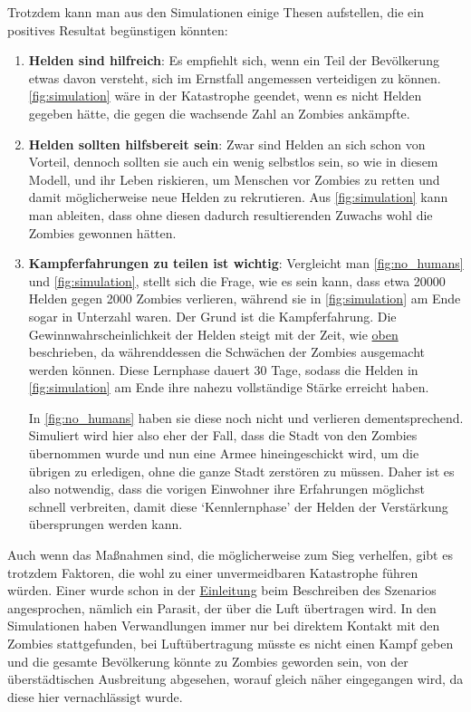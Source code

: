     Trotzdem kann man aus den Simulationen einige Thesen aufstellen, die ein positives Resultat begünstigen könnten:
    \begin{enumerate}[1.]
        \item \textbf{Helden sind hilfreich}:
            Es empfiehlt sich, wenn ein Teil der Bevölkerung etwas davon versteht, sich im Ernstfall angemessen verteidigen zu können. \autoref{fig:simulation} wäre in der Katastrophe geendet, wenn es nicht Helden gegeben hätte, die gegen die wachsende Zahl an Zombies ankämpfte.

        \item \textbf{Helden sollten hilfsbereit sein}:
            Zwar sind Helden an sich schon von Vorteil, dennoch sollten sie auch ein wenig selbstlos sein, so wie in diesem Modell, und ihr Leben riskieren, um Menschen vor Zombies zu retten und damit möglicherweise neue Helden zu rekrutieren. Aus \autoref{fig:simulation} kann man ableiten, dass ohne diesen dadurch resultierenden Zuwachs wohl die Zombies gewonnen hätten.

        \item \textbf{Kampferfahrungen zu teilen ist wichtig}:
            Vergleicht man \autoref{fig:no_humans} und \autoref{fig:simulation}, stellt sich die Frage, wie es sein kann, dass etwa 20000 Helden gegen 2000 Zombies verlieren, während sie in \autoref{fig:simulation} am Ende sogar in Unterzahl waren. Der Grund ist die Kampferfahrung. Die Gewinnwahrscheinlichkeit der Helden steigt mit der Zeit, wie \hyperref[steps:no_humans]{oben} beschrieben, da währenddessen die Schwächen der Zombies ausgemacht werden können. Diese Lernphase dauert 30 Tage, sodass die Helden in \autoref{fig:simulation} am Ende ihre nahezu vollständige Stärke erreicht haben.

            In \autoref{fig:no_humans} haben sie diese noch nicht und verlieren dementsprechend. Simuliert wird hier also eher der Fall, dass die Stadt von den Zombies übernommen wurde und nun eine Armee hineingeschickt wird, um die übrigen zu erledigen, ohne die ganze Stadt zerstören zu müssen. Daher ist es also notwendig, dass die vorigen Einwohner ihre Erfahrungen möglichst schnell verbreiten, damit diese `Kennlernphase' der Helden der Verstärkung übersprungen werden kann.
    \end{enumerate}
    Auch wenn das Maßnahmen sind, die möglicherweise zum Sieg verhelfen, gibt es trotzdem Faktoren, die wohl zu einer unvermeidbaren Katastrophe führen würden. Einer wurde schon in der \hyperref[sec:einleitung]{Einleitung} beim Beschreiben des Szenarios angesprochen, nämlich ein Parasit, der über die Luft übertragen wird. In den Simulationen haben Verwandlungen immer nur bei direktem Kontakt mit den Zombies stattgefunden, bei Luftübertragung müsste es nicht einen Kampf geben und die gesamte Bevölkerung könnte zu Zombies geworden sein, von der überstädtischen Ausbreitung abgesehen, worauf gleich näher eingegangen wird, da diese hier vernachlässigt wurde.

